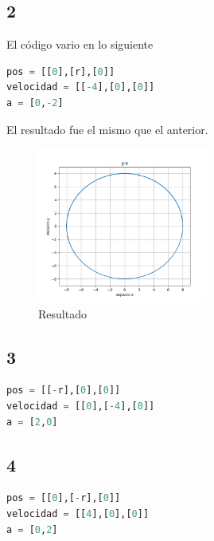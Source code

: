 \documentclass{article}
\begin{document}
\subsection{2}
El código vario en lo siguiente
\begin{lstlisting}[language=Python,caption=Desafío 1.1]
pos = [[0],[r],[0]]
velocidad = [[-4],[0],[0]]
a = [0,-2]
\end{lstlisting}
El resultado fue el mismo que el anterior.
\begin{figure}[H]
    \centering
    \includegraphics[width=0.5\textwidth]{1.png}
    \caption{Resultado}
\end{figure}
\subsection{3}
\begin{lstlisting}[language=Python,caption=Desafío 1.1]
pos = [[-r],[0],[0]]
velocidad = [[0],[-4],[0]]
a = [2,0]
\end{lstlisting}

\subsection{4}
\begin{lstlisting}[language=Python,caption=Desafío 1.1]
pos = [[0],[-r],[0]]
velocidad = [[4],[0],[0]]
a = [0,2]
\end{lstlisting}
\end{document}
